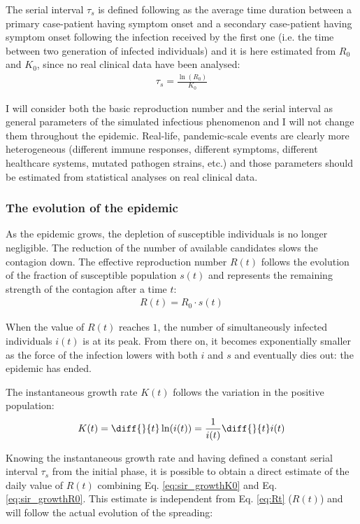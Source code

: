 \documentclass[DIV=12, BCOR=0pt]{scrartcl}  %
\begin{document}
	The serial interval $\tau_s$ is defined following \citet{Du2020} as the average time duration between a primary case-patient having symptom onset and a secondary case-patient having symptom onset following the infection received by the first one (i.e. the time between two generation of infected individuals) and it is here estimated from $R_0$ and $K_0$, since no real clinical data have been analysed: 
	\begin{align}
		\tau_s = \frac{\ln(R_0)}{K_0}
		\label{eq:serial}
	\end{align}

	I will consider both the basic reproduction number and the serial interval as general parameters of the simulated infectious phenomenon and I will not change them throughout the epidemic. Real-life, pandemic-scale events are clearly more heterogeneous (different immune responses, different symptoms, different healthcare systems, mutated pathogen strains, etc.) and those parameters should be estimated from statistical analyses on real clinical data.  

  \subsubsection{The evolution of the epidemic}
  As the epidemic grows, the depletion of susceptible individuals is no longer negligible. The reduction of the number of available candidates slows the contagion down.
  The effective reproduction number $R(t)$ follows the evolution of the fraction of susceptible population $s(t)$ and represents the remaining strength of the contagion after a time $t$:
  \begin{align}
		R(t) = R_0 \cdot s(t) 
		\label{eq:Rt}
  \end{align}

  When the value of $R(t)$ reaches $1$, the number of simultaneously infected individuals $i(t)$ is at its peak. From there on, it becomes exponentially smaller as the force of the infection lowers with both $i$ and $s$ and eventually dies out: the epidemic has ended.
  
  The instantaneous growth rate $K(t)$ follows the variation in the positive population:
  \begin{align}
  	K(t) =  \diff{}{t} \ln(i(t)) = \frac{1}{i(t)} \diff{}{t} i(t)
  	\label{eq:Kt}
  \end{align}

	Knowing the instantaneous growth rate and having defined a constant serial interval $\tau_s$ from the initial phase, it is possible to obtain a direct estimate of the daily value of $R(t)$ combining Eq. \ref{eq:sir_growthK0} and Eq. \ref{eq:sir_growthR0}. This estimate is independent from Eq. \ref{eq:Rt} ($R(t)$) and will follow the actual evolution of the spreading:
\end{document}
